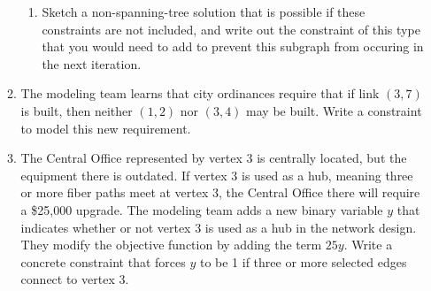 \documentclass[letterpaper,oneside,12pt]{article}%
\begin{document}
\begin{enumerate}
\begin{enumerate}
\begin{enumerate}
\item  Sketch a non-spanning-tree solution that is possible if these constraints are not included, and write out the constraint of this type that you would need to add to prevent this subgraph from occuring in the next iteration.

\end{enumerate}
\item The modeling team learns that city ordinances require that if link $(3,7)$ is built, then neither $(1,2)$ nor $(3,4)$ may be built.  Write a constraint to model this new requirement.

\item The Central Office represented by vertex 3 is centrally located, but the equipment there is outdated.  If vertex 3 is used as a hub, meaning three or more fiber paths meet at vertex 3, the Central Office there will require a \$25,000 upgrade.  The modeling team adds a new binary variable $y$ that indicates whether or not vertex 3 is used as a hub in the network design.  They modify the objective function by adding the term $25y$.  Write a concrete constraint that forces $y$ to be 1 if three or more selected edges connect to vertex 3.


%
\end{enumerate}






\end{enumerate}
\end{document}
